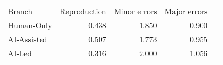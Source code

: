 \begin{tabular}{lrrrr}
\hline\hline
Branch & Reproduction & Minor errors & Major errors \\
Human-Only & 0.438 & 1.850 & 0.900 \\
AI-Assisted & 0.507 & 1.773 & 0.955 \\
AI-Led & 0.316 & 2.000 & 1.056 \\
\hline\hline
\end{tabular}
